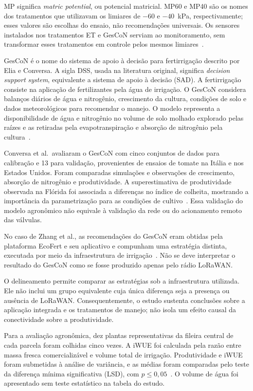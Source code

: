 \documentclass[11pt,a4paper]{article}
\begin{document}
MP significa \textit{matric potential}, ou potencial matricial. MP60 e MP40 são os nomes dos tratamentos que utilizavam os limiares de $-60$ e $-40$~kPa, respectivamente; esses valores são escolhas do ensaio, não recomendações universais. Os sensores instalados nos tratamentos ET e GesCoN serviam ao monitoramento, sem transformar esses tratamentos em controle pelos mesmos limiares~\cite{zhang2022}.

GesCoN é o nome do sistema de apoio à decisão para fertirrigação descrito por Elia e Conversa. A sigla DSS, usada na literatura original, significa \textit{decision support system}, equivalente a sistema de apoio à decisão (SAD). A fertirrigação consiste na aplicação de fertilizantes pela água de irrigação. O GesCoN considera balanços diários de água e nitrogênio, crescimento da cultura, condições de solo e dados meteorológicos para recomendar o manejo. O modelo representa a disponibilidade de água e nitrogênio no volume de solo molhado explorado pelas raízes e as retiradas pela evapotranspiração e absorção de nitrogênio pela cultura~\cite{elia2015}.

Conversa et al.\ avaliaram o GesCoN com cinco conjuntos de dados para calibração e 13 para validação, provenientes de ensaios de tomate na Itália e nos Estados Unidos. Foram comparadas simulações e observações de crescimento, absorção de nitrogênio e produtividade. A superestimativa de produtividade observada na Flórida foi associada a diferenças no índice de colheita, mostrando a importância da parametrização para as condições de cultivo~\cite{conversa2015}. Essa validação do modelo agronômico não equivale à validação da rede ou do acionamento remoto das válvulas.

No caso de Zhang et al., as recomendações do GesCoN eram obtidas pela plataforma EcoFert e seu aplicativo e compunham uma estratégia distinta, executada por meio da infraestrutura de irrigação~\cite{zhang2022}. Não se deve interpretar o resultado do GesCoN como se fosse produzido apenas pelo rádio LoRaWAN.

O delineamento permite comparar as estratégias sob a infraestrutura utilizada. Ele não inclui um grupo equivalente cuja única diferença seja a presença ou ausência de LoRaWAN. Consequentemente, o estudo sustenta conclusões sobre a aplicação integrada e os tratamentos de manejo; não isola um efeito causal da conectividade sobre a produtividade.

Para a avaliação agronômica, dez plantas representativas da fileira central de cada parcela foram colhidas cinco vezes. A iWUE foi calculada pela razão entre massa fresca comercializável e volume total de irrigação. Produtividade e iWUE foram submetidas à análise de variância, e as médias foram comparadas pelo teste da diferença mínima significativa (LSD), com $p \leq 0{,}05$~\cite{zhang2022}. O volume de água foi apresentado sem teste estatístico na tabela do estudo.
\end{document}
